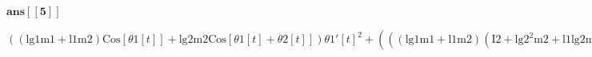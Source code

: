 \documentclass{article}
\begin{document}
\begin{doublespace}
\noindent\(\pmb{\text{ans}[[5]]}\)
\end{doublespace}

\begin{doublespace}
\noindent\(((\text{lg1} \text{m1}+\text{l1} \text{m2}) \text{Cos}[\text{$\theta $1}[t]]+\text{lg2} \text{m2} \text{Cos}[\text{$\theta $1}[t]+\text{$\theta
$2}[t]]) \text{$\theta $1}'[t]^2+\left(\left((\text{lg1} \text{m1}+\text{l1} \text{m2}) \left(\text{I2}+\text{lg2}^2 \text{m2}+\text{l1} \text{lg2}
\text{m2} \text{Cos}[\text{$\theta $2}[t]]\right) \text{Sin}[\text{$\theta $1}[t]]-\text{lg2} \text{m2} \left(\text{I1}+\text{lg1}^2 \text{m1}+\text{l1}^2
\text{m2}+\text{l1} \text{lg2} \text{m2} \text{Cos}[\text{$\theta $2}[t]]\right) \text{Sin}[\text{$\theta $1}[t]+\text{$\theta $2}[t]]\right) \left(-\text{$\tau
$2}+g \text{lg2} \text{m2} \text{Cos}[\text{$\theta $1}[t]+\text{$\theta $2}[t]]+\text{l1} \text{lg2} \text{m2} \text{Sin}[\text{$\theta $2}[t]]
\text{$\theta $1}'[t]^2\right)\right)/\left(\left(\text{I1}+\text{lg1}^2 \text{m1}+\text{l1}^2 \text{m2}\right) \left(\text{I2}+\text{lg2}^2 \text{m2}\right)-\text{l1}^2
\text{lg2}^2 \text{m2}^2 \text{Cos}[\text{$\theta $2}[t]]^2\right)+2 \text{lg2} \text{m2} \text{Cos}[\text{$\theta $1}[t]+\text{$\theta $2}[t]] \text{$\theta
$1}'[t] \text{$\theta $2}'[t]+\text{lg2} \text{m2} \text{Cos}[\text{$\theta $1}[t]+\text{$\theta $2}[t]] \text{$\theta $2}'[t]^2-\left(\left((\text{lg1}
\text{m1}+\text{l1} \text{m2}) \left(\text{I2}+\text{lg2}^2 \text{m2}\right) \text{Sin}[\text{$\theta $1}[t]]-\text{l1} \text{lg2}^2 \text{m2}^2
\text{Cos}[\text{$\theta $2}[t]] \text{Sin}[\text{$\theta $1}[t]+\text{$\theta $2}[t]]\right) \left(-\text{$\tau $1}+g \text{lg1} \text{m1} \text{Cos}[\text{$\theta
$1}[t]]+g \text{l1} \text{m2} \text{Cos}[\text{$\theta $1}[t]]+g \text{lg2} \text{m2} \text{Cos}[\text{$\theta $1}[t]+\text{$\theta $2}[t]]-2 \text{l1}
\text{lg2} \text{m2} \text{Sin}[\text{$\theta $2}[t]] \text{$\theta $1}'[t] \text{$\theta $2}'[t]-\text{l1} \text{lg2} \text{m2} \text{Sin}[\text{$\theta
$2}[t]] \text{$\theta $2}'[t]^2\right)\right)/\left(\left(\text{I1}+\text{lg1}^2 \text{m1}+\text{l1}^2 \text{m2}\right) \left(\text{I2}+\text{lg2}^2
\text{m2}\right)-\text{l1}^2 \text{lg2}^2 \text{m2}^2 \text{Cos}[\text{$\theta $2}[t]]^2\right)\)
\end{doublespace}

\begin{doublespace}
\noindent\(\pmb{\text{}}\)
\end{doublespace}
\end{document}
